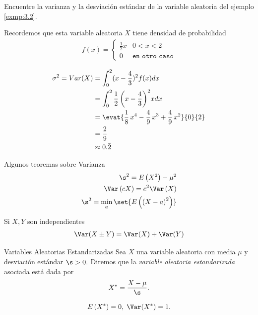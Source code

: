  \begin{ejemplo} %
  \label{exmp:3.4}
  Encuentre la varianza y la desviación estándar de la variable aleatoria del ejemplo \ref{exmp:3.2}.
 \end{ejemplo}


{}
Recordemos que esta variable aleatoria $X$ tiene densidad de probabilidad
  \begin{align}
   f(x)=
   \begin{cases}
    \frac{1}{2}x & 0<x<2 \\
    0 & \texttt{en otro caso}
   \end{cases}
  \end{align}

{}
\begin{align}
 \sigma^2 = Var(X) &= \displaystyle \int_{0}^{2}(x-\frac{4}{3})^2f(x) dx
 \\  &= \displaystyle \int_{0}^{2} \frac{1}{2} \, {\left(x - \frac{4}{3}\right)}^{2} x dx
 \\  &= \displaystyle
 \evat{\frac{1}{8} \, x^{4} - \frac{4}{9} \, x^{3} + \frac{4}{9} \, x^{2}}{0}{2}
 \\  &= \displaystyle \frac{2}{9}
\\  &\approx \displaystyle 0.\bar{2}
\end{align}

{Algunos teoremas sobre Varianza}
\begin{align}
 \label{eq:3.16}
 \s^{2}=E\left( X^{2} \right)-\mu^{2} \\ 
 \label{eq:3.17}
 \Var\left( cX \right)=c^{2}\Var\left( X \right)\\ 
 \label{thm:3.6}
 \s^{2}=\min_{a}\set{E\left( \left( X-a \right)^{2} \right)}
\end{align}

Si $X,Y$ son independientes
\begin{align}
 \label{eq:3.18}
 \Var(X\pm Y)=\Var(X)+\Var(Y)
\end{align}


{Variables Aleatorias Estandarizadas}
 Sea $X$ una variable aleatoria con media $\mu$ y desviación estándar $\s>0.$ Diremos que la \emph{variable aleatoria estandarizada} asociada está dada por
 \begin{align}
  \label{eq:3.20}
  X^{*}=\dfrac{X-\mu}{\s}.
 \end{align}


\begin{align}
 \label{eq:3.21}
 E\left( X^{*} \right)=0, \; \Var(X^{*})=1.
\end{align}


